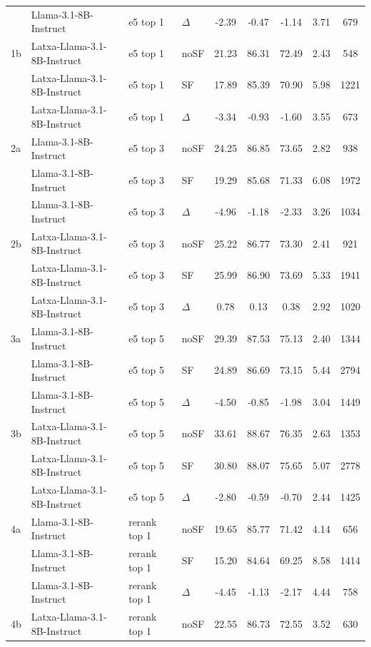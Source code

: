\begin{scriptsize}
\begin{longtable}{l l l l c c c c c}
 & Llama-3.1-8B-Instruct & e5 top 1 & $\Delta$ & -2.39 & -0.47 & -1.14 & 3.71 & 679 \\
1b & Latxa-Llama-3.1-8B-Instruct & e5 top 1 & noSF & 21.23 & 86.31 & 72.49 & 2.43 & 548 \\
 & Latxa-Llama-3.1-8B-Instruct & e5 top 1 & SF & 17.89 & 85.39 & 70.90 & 5.98 & 1221 \\
 & Latxa-Llama-3.1-8B-Instruct & e5 top 1 & $\Delta$ & -3.34 & -0.93 & -1.60 & 3.55 & 673 \\
\dmidrule
2a & Llama-3.1-8B-Instruct & e5 top 3 & noSF & 24.25 & 86.85 & 73.65 & 2.82 & 938 \\
 & Llama-3.1-8B-Instruct & e5 top 3 & SF & 19.29 & 85.68 & 71.33 & 6.08 & 1972 \\
 & Llama-3.1-8B-Instruct & e5 top 3 & $\Delta$ & -4.96 & -1.18 & -2.33 & 3.26 & 1034 \\
2b & Latxa-Llama-3.1-8B-Instruct & e5 top 3 & noSF & 25.22 & 86.77 & 73.30 & 2.41 & 921 \\
 & Latxa-Llama-3.1-8B-Instruct & e5 top 3 & SF & 25.99 & 86.90 & 73.69 & 5.33 & 1941 \\
 & Latxa-Llama-3.1-8B-Instruct & e5 top 3 & $\Delta$ & 0.78 & 0.13 & 0.38 & 2.92 & 1020 \\
\dmidrule
3a & Llama-3.1-8B-Instruct & e5 top 5 & noSF & 29.39 & 87.53 & 75.13 & 2.40 & 1344 \\
 & Llama-3.1-8B-Instruct & e5 top 5 & SF & 24.89 & 86.69 & 73.15 & 5.44 & 2794 \\
 & Llama-3.1-8B-Instruct & e5 top 5 & $\Delta$ & -4.50 & -0.85 & -1.98 & 3.04 & 1449 \\
3b & Latxa-Llama-3.1-8B-Instruct & e5 top 5 & noSF & 33.61 & 88.67 & 76.35 & 2.63 & 1353 \\
 & Latxa-Llama-3.1-8B-Instruct & e5 top 5 & SF & 30.80 & 88.07 & 75.65 & 5.07 & 2778 \\
 & Latxa-Llama-3.1-8B-Instruct & e5 top 5 & $\Delta$ & -2.80 & -0.59 & -0.70 & 2.44 & 1425 \\
\dmidrule
4a & Llama-3.1-8B-Instruct & rerank top 1 & noSF & 19.65 & 85.77 & 71.42 & 4.14 & 656 \\
 & Llama-3.1-8B-Instruct & rerank top 1 & SF & 15.20 & 84.64 & 69.25 & 8.58 & 1414 \\
 & Llama-3.1-8B-Instruct & rerank top 1 & $\Delta$ & -4.45 & -1.13 & -2.17 & 4.44 & 758 \\
4b & Latxa-Llama-3.1-8B-Instruct & rerank top 1 & noSF & 22.55 & 86.73 & 72.55 & 3.52 & 630 \\

\end{longtable}
\end{scriptsize}
